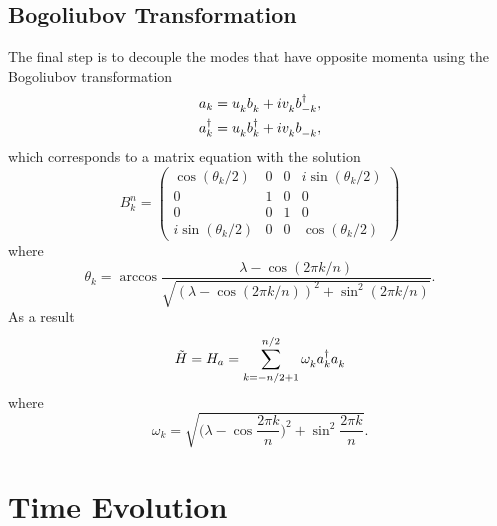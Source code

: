 \documentclass[12pt]{article}
\newcommand*{\iu}{i}
\begin{document}
  \subsection{Bogoliubov Transformation}

  The final step is to decouple the modes that have opposite momenta using the Bogoliubov transformation
  \begin{subequations}
    \begin{align}
      a_{k}
        &= u_{k}^{\vphantom{\dagger}} b_{k}^{\vphantom{\dagger}}
           + \iu v_{k}^{\vphantom{\dagger}} b_{-k}^{\dagger}, \\
      a_{k}^{\dagger}
        &= u_{k}^{\vphantom{\dagger}} b_{k}^{\dagger}
           + \iu v_{k}^{\vphantom{\dagger}} b_{-k}^{\vphantom{\dagger}},
    \end{align}
  \end{subequations}
  which corresponds to a matrix equation with the solution
  \begin{equation}
    B_{k}^{n}
      = \begin{pmatrix}
              \cos(\theta_{k} / 2) & 0 & 0 & \iu \sin(\theta_{k} / 2) \\
                                 0 & 1 & 0 &                        0 \\
                                 0 & 0 & 1 &                        0 \\
          \iu \sin(\theta_{k} / 2) & 0 & 0 &     \cos(\theta_{k} / 2)
      \end{pmatrix}
  \end{equation}
  where
  \begin{equation}
    \theta_{k}
      = \arccos
        \frac{\lambda - \cos(2 \pi k / n)}
             {\sqrt{(\lambda - \cos(2 \pi k / n))^{2} + \sin^{2}(2 \pi k / n)}}.
  \end{equation}
  As a result
  \begin{equation}
    \tilde{H}
      = H_{a}
      = \sum_{k = -n / 2 + 1}^{n / 2}
        \omega_{k}^{\vphantom{\dagger}} a_{k}^{\dagger}
        a_{k}^{\vphantom{\dagger}}
  \end{equation}
  where
  \begin{equation}
    \omega_{k}
      = \sqrt{\biggl( \lambda - \cos \frac{2\pi k}{n} \biggr)^{2}
              + \sin^{2} \frac{2\pi k}{n}}.
  \end{equation}



  \section{Time Evolution}
\end{document}
